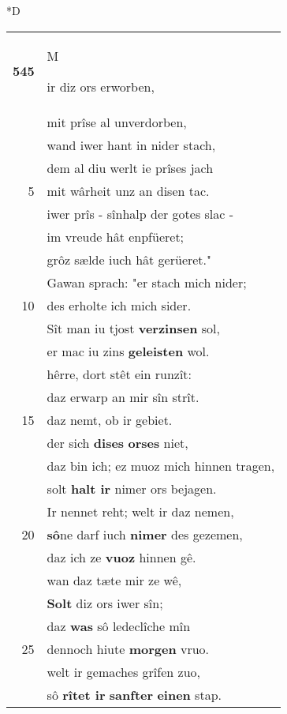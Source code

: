\documentclass[8pt,a4paper,notitlepage]{article}
\begin{document}
\begin{table}[ht]
\begin{minipage}[t]{0.5\linewidth}
\small
\begin{center}*D
\end{center}
\begin{tabular}{rl}
\textbf{545} & \begin{large}M\end{large}ir diz ors erworben,\\ 
 & mit prîse al unverdorben,\\ 
 & wand iwer hant in nider stach,\\ 
 & dem al diu werlt ie prîses jach\\ 
5 & mit wârheit unz an disen tac.\\ 
 & iwer prîs - sînhalp der gotes slac -\\ 
 & im vreude hât enpfüeret;\\ 
 & grôz sælde iuch hât gerüeret."\\ 
 & Gawan sprach: "er stach mich nider;\\ 
10 & des erholte ich mich sider.\\ 
 & Sît man iu tjost \textbf{verzinsen} sol,\\ 
 & er mac iu zins \textbf{geleisten} wol.\\ 
 & hêrre, dort stêt ein runzît:\\ 
 & daz erwarp an mir sîn strît.\\ 
15 & daz nemt, ob ir gebiet.\\ 
 & der sich \textbf{dises} \textbf{orses} niet,\\ 
 & daz bin ich; ez muoz mich hinnen tragen,\\ 
 & solt \textbf{halt ir} nimer ors bejagen.\\ 
 & Ir nennet reht; welt ir daz nemen,\\ 
20 & \textbf{sô}ne darf iuch \textbf{nimer} des gezemen,\\ 
 & daz ich ze \textbf{vuoz} hinnen gê.\\ 
 & wan daz tæte mir ze wê,\\ 
 & \textbf{Solt} diz ors iwer sîn;\\ 
 & daz \textbf{was} sô ledeclîche mîn\\ 
25 & dennoch hiute \textbf{morgen} vruo.\\ 
 & welt ir gemaches grîfen zuo,\\ 
 & sô \textbf{rîtet ir} \textbf{sanfter} \textbf{einen} stap.\\ 

\end{tabular}
\end{minipage}
\end{table}
\end{document}
